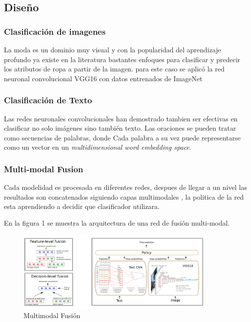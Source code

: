 \documentclass[conference]{IEEEtran}
\begin{document}
\subsection{Diseño}

\subsubsection{Clasificación de imagenes}
La moda es un dominio muy visual y con la popularidad del aprendizaje profundo ya existe en la literatura bastantes enfoques para clasificar y predecir los atributos de ropa a partir de la imagen. para este caso se aplicó la red neuronal convolucional VGG16 con datos entrenados de ImageNet

\subsubsection{Clasificación de Texto}
Las redes neuronales convolucionales han demostrado tambien ser efectivas en clasificar no solo imágenes sino también
texto. Las oraciones se pueden tratar como secuencias de palabras, donde
Cada palabra a su vez puede representarse como un vector en un \textit{multidimensional
word embedding space}.

\subsubsection{Multi-modal Fusion}

Cada modelidad es procesada en diferentes redes, despues de llegar a un nivel las resultados son concatenados siguiendo capas multimodales , la politica de la red esta aprendiendo a decidir que clasificador utilizara.

En la figura 1\cite{b1} se muestra la arquitectura de una red de fusión multi-modal.




\begin{figure}
  \includegraphics[width=\textwidth,height=4cm]{figura1.png}
  \caption{Multimodal Fusión}
  \label{fig}
\end{figure}
\end{document}

